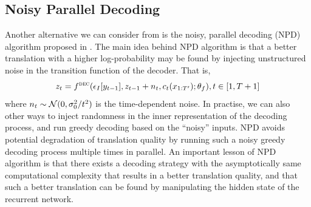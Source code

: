 \subsection{Noisy Parallel Decoding}
\label{cp2.sec.noisy}
Another alternative we can consider from is the noisy, parallel decoding (NPD) algorithm proposed in . The main idea behind NPD algorithm is that a better translation with a higher log-probability may be found by injecting unstructured noise in the transition function of the decoder. That is,
\begin{equation}
z_t = f^{\textsc{dec}}(\epsilon_I[y_{t-1}], z_{t-1} + n_t, c_t(x_{1:T'}); \theta_f), t\in [1, T+1]
\end{equation}
where $n_t \sim \mathcal{N}(0, {\sigma_0^2} \large / {t^2})$ is the time-dependent noise. In practise, we can also other ways to inject randomness in the inner representation of the decoding process, and run greedy decoding based on the ``noisy'' inputs. 
NPD avoids potential degradation of translation quality by running such a noisy greedy decoding process multiple times in parallel. An important lesson of NPD algorithm is that there exists a decoding strategy with the asymptotically same computational complexity that results in a better translation quality, and that such a better translation can be found by manipulating the hidden state of the recurrent network. 


